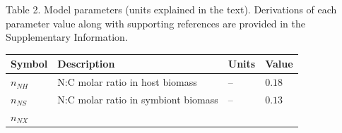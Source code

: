 \documentclass[]{elsarticle} %
\begin{document}
Table 2. Model parameters (units explained in the text). Derivations of
each parameter value along with supporting references are provided in
the Supplementary Information.

\begin{longtable}[]{@{}llll@{}}
\toprule
\begin{minipage}[b]{0.09\columnwidth}\raggedright\strut
Symbol\strut
\end{minipage} & \begin{minipage}[b]{0.46\columnwidth}\raggedright\strut
Description\strut
\end{minipage} & \begin{minipage}[b]{0.24\columnwidth}\raggedright\strut
Units\strut
\end{minipage} & \begin{minipage}[b]{0.09\columnwidth}\raggedright\strut
Value\strut
\end{minipage}\tabularnewline
\midrule
\endhead
\begin{minipage}[t]{0.09\columnwidth}\raggedright\strut
\(n_{NH}\)\strut
\end{minipage} & \begin{minipage}[t]{0.46\columnwidth}\raggedright\strut
N:C molar ratio in host biomass\strut
\end{minipage} & \begin{minipage}[t]{0.24\columnwidth}\raggedright\strut
--\strut
\end{minipage} & \begin{minipage}[t]{0.09\columnwidth}\raggedright\strut
\(0.18\)\strut
\end{minipage}\tabularnewline
\begin{minipage}[t]{0.09\columnwidth}\raggedright\strut
\(n_{NS}\)\strut
\end{minipage} & \begin{minipage}[t]{0.46\columnwidth}\raggedright\strut
N:C molar ratio in symbiont biomass\strut
\end{minipage} & \begin{minipage}[t]{0.24\columnwidth}\raggedright\strut
--\strut
\end{minipage} & \begin{minipage}[t]{0.09\columnwidth}\raggedright\strut
\(0.13\)\strut
\end{minipage}\tabularnewline
\begin{minipage}[t]{0.09\columnwidth}\raggedright\strut
\(n_{NX}\)\strut
\end{minipage} & \begin{minipage}[t]{0.46\columnwidth}\raggedright\strut

\end{minipage}
\end{longtable}
\end{document}
